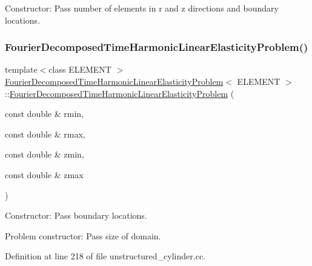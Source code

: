 Constructor\+: Pass number of elements in r and z directions and boundary locations. 

\mbox{\label{classFourierDecomposedTimeHarmonicLinearElasticityProblem_a6960b05a48af6837c9db919a01a34640}} 
\subsubsection{\texorpdfstring{Fourier\+Decomposed\+Time\+Harmonic\+Linear\+Elasticity\+Problem()}{FourierDecomposedTimeHarmonicLinearElasticityProblem()}\hspace{0.1cm}{\footnotesize\ttfamily [3/3]}}
{\footnotesize\ttfamily template$<$class E\+L\+E\+M\+E\+NT $>$ \\
\hyperlink{classFourierDecomposedTimeHarmonicLinearElasticityProblem}{Fourier\+Decomposed\+Time\+Harmonic\+Linear\+Elasticity\+Problem}$<$ E\+L\+E\+M\+E\+NT $>$\+::\hyperlink{classFourierDecomposedTimeHarmonicLinearElasticityProblem}{Fourier\+Decomposed\+Time\+Harmonic\+Linear\+Elasticity\+Problem} (\begin{DoxyParamCaption}\item[{const double \&}]{rmin,  }\item[{const double \&}]{rmax,  }\item[{const double \&}]{zmin,  }\item[{const double \&}]{zmax }\end{DoxyParamCaption})}



Constructor\+: Pass boundary locations. 

Problem constructor\+: Pass size of domain. 

Definition at line 218 of file unstructured\+\_\+cylinder.\+cc.



